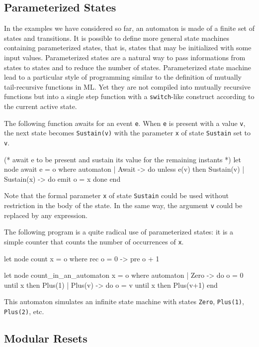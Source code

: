 \documentclass[11pt,titlepage,twoside]{report}
\begin{document}
\subsection{Parameterized States\label{paramstates}} %

In the examples we have considered so far, an automaton is made of a
finite set of states and transitions. It is possible to define more
general state machines containing parameterized states, that is,
states that may be initialized with some input values. Parameterized
states are a natural way to pass informations from states to states
and to reduce the number of states. Parameterized state machine
lead to a particular style of programming similar to the
definition of mutually tail-recursive functions in ML. Yet they are not
compiled into mutually recursive functions but into a single step
function with a \texttt{switch}-like construct according to the current
active state.

The following function awaits for an event \texttt{e}. When \texttt{e} is present with
a value \texttt{v}, the next state becomes \texttt{Sustain(v)} with the parameter
\texttt{x} of state \texttt{Sustain} set to \texttt{v}.
\begin{chklisting}[withresult,label=await]
(* await e to be present and sustain its value for the remaining instants *)
let node await e = o where 
  automaton
  | Await -> do unless e(v) then Sustain(v)
  | Sustain(x) -> do emit o = x done
  end
\end{chklisting}

Note that the formal parameter \verb-x- of state \verb-Sustain- could
be used without restriction in the body of the state. In the same way, the
argument \verb-v- could be replaced by any expression.

\medskip
The following program is a quite radical use of parameterized states: it
is a simple counter that counts the number of
occurrences of \verb-x-.
\begin{chklisting}[withresult]
let node count x = o where rec o = 0 -> pre o + 1

let node count_in_an_automaton x = o where
  automaton
  | Zero -> do o = 0 until x then Plus(1)
  | Plus(v) -> do o = v until x then Plus(v+1)
  end
\end{chklisting}

This automaton simulates an infinite state machine with states
\verb-Zero-, \verb-Plus(1)-, \verb-Plus(2)-, etc.

\subsection{Modular Resets\label{resets}} %
\end{document}
